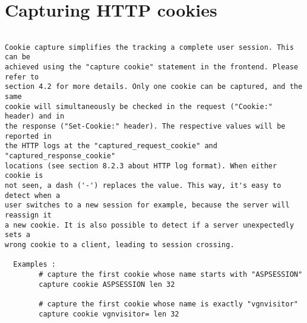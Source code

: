 
\section{Capturing HTTP cookies}

\begin{verbatim}

Cookie capture simplifies the tracking a complete user session. This can be
achieved using the "capture cookie" statement in the frontend. Please refer to
section 4.2 for more details. Only one cookie can be captured, and the same
cookie will simultaneously be checked in the request ("Cookie:" header) and in
the response ("Set-Cookie:" header). The respective values will be reported in
the HTTP logs at the "captured_request_cookie" and "captured_response_cookie"
locations (see section 8.2.3 about HTTP log format). When either cookie is
not seen, a dash ('-') replaces the value. This way, it's easy to detect when a
user switches to a new session for example, because the server will reassign it
a new cookie. It is also possible to detect if a server unexpectedly sets a
wrong cookie to a client, leading to session crossing.

  Examples :
        # capture the first cookie whose name starts with "ASPSESSION"
        capture cookie ASPSESSION len 32

        # capture the first cookie whose name is exactly "vgnvisitor"
        capture cookie vgnvisitor= len 32


\end{verbatim}
